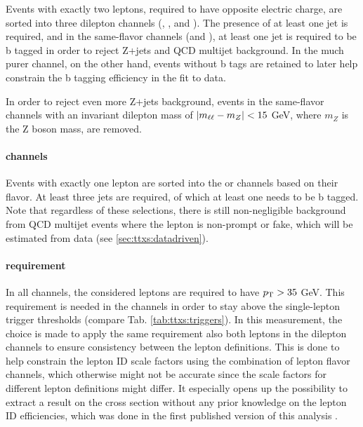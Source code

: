 Events with exactly two leptons, required to have opposite electric charge, are sorted into three dilepton channels (\emu, \ee, and \mumu). The presence of at least one jet is required, and in the same-flavor channels (\ee and \mumu), at least one jet is required to be b tagged in order to reject Z+jets and QCD multijet background. In the much purer \emu channel, on the other hand, events without b tags are retained to later help constrain the b tagging efficiency in the fit to data.

In order to reject even more Z+jets background, events in the same-flavor channels with an invariant dilepton mass of $| m_{\ell\ell} - m_Z | < 15$ GeV, where $m_Z$ is the Z boson mass, are removed.

\paragraph{\ljets channels}

Events with exactly one lepton are sorted into the \ejets or \mujets channels based on their flavor. At least three jets are required, of which at least one needs to be b tagged. Note that regardless of these selections, there is still non-negligible background from QCD multijet events where the lepton is non-prompt or fake, which will be estimated from data (see \cref{sec:ttxs:datadriven}).

\paragraph{\pt requirement}

In all channels, the considered leptons are required to have $p_{\mathrm{T}} > 35$ GeV. This requirement is needed in the \ljets channels in order to stay above the single-lepton trigger \pt thresholds (compare Tab. \ref{tab:ttxs:triggers}). In this measurement, the choice is made to apply the same \pt requirement also both leptons in the dilepton channels to ensure consistency between the lepton definitions. This is done to help constrain the lepton ID scale factors using the combination of lepton flavor channels, which otherwise might not be accurate since the scale factors for different lepton definitions might differ. It especially opens up the possibility to extract a result on the cross section without any prior knowledge on the lepton ID efficiencies, which was done in the first published version of this analysis \cite{CMS:TOP-22-012-PAS}. %

